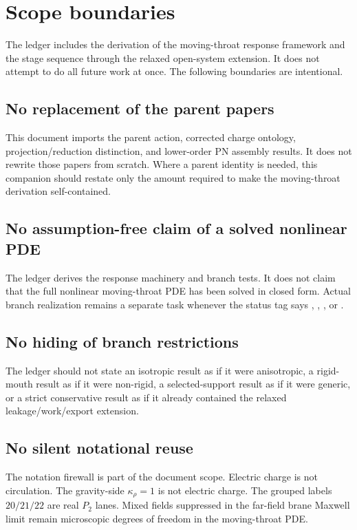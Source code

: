 \section{Scope boundaries}

The ledger includes the derivation of the moving-throat response framework and the stage sequence through the relaxed open-system extension.  It does not attempt to do all future work at once.  The following boundaries are intentional.

\subsection{No replacement of the parent papers}

This document imports the parent action, corrected charge ontology, projection/reduction distinction, and lower-order PN assembly results.  It does not rewrite those papers from scratch.  Where a parent identity is needed, this companion should restate only the amount required to make the moving-throat derivation self-contained.

\subsection{No assumption-free claim of a solved nonlinear PDE}

The ledger derives the response machinery and branch tests.  It does not claim that the full nonlinear moving-throat PDE has been solved in closed form.  Actual branch realization remains a separate task whenever the status tag says \StatusOpen, \StatusNumerical, \StatusEffective, or \StatusExactClosure.

\subsection{No hiding of branch restrictions}

The ledger should not state an isotropic result as if it were anisotropic, a rigid-mouth result as if it were non-rigid, a selected-support result as if it were generic, or a strict conservative result as if it already contained the relaxed leakage/work/export extension.

\subsection{No silent notational reuse}

The notation firewall is part of the document scope.  Electric charge is not circulation.  The gravity-side \(\kappa_\rho=1\) is not electric charge.  The grouped labels \(20/21/22\) are real \(P_2\) lanes.  Mixed fields suppressed in the far-field brane Maxwell limit remain microscopic degrees of freedom in the moving-throat PDE.


